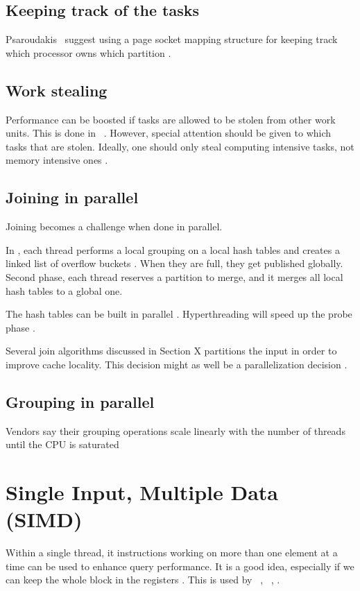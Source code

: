 \subsection{Keeping track of the tasks}
\label{sub:Keeping track of the tasks}
Psaroudakis \ea~suggest using a page socket mapping structure for keeping track which processor owns which partition \cite{Psaroudakis2015-lc}.


\subsection{Work stealing}
\label{sub:Work stealing}
Performance can be boosted if tasks are allowed to be stolen from other work units. This is done in \blink~\cite{Barber2012-xt}. However, special attention should be given to which tasks that are stolen. Ideally, one should only steal computing intensive tasks, not memory intensive ones \cite{Psaroudakis2015-lc}.

\subsection{Joining in parallel}
\label{sub:Joining in parallel}
Joining becomes a challenge when done in parallel.

In \ibm, each thread performs a local grouping on a local hash tables and creates a linked list of overflow buckets \cite{Raman2013-em}. When they are full, they get published globally. Second phase, each thread reserves a partition to merge, and it merges all local hash tables to a global one.

The hash tables can be built in parallel \cite{Barber2014-ey}. Hyperthreading will speed up the probe phase .

Several join algorithms discussed in Section X partitions the input in order to improve cache locality. This decision might as well be a parallelization decision \cite{Neumann1011-uq}.

\subsection{Grouping in parallel}
\label{sub:Grouping in parallel}
Vendors say their grouping operations scale linearly with the number of threads until the CPU is saturated \cite{Farber2012-vh}

\section{Single Input, Multiple Data (SIMD)}
\label{sec:Single Input, Multiple Instructions (SIMD)}
Within a single thread, it instructions working on more than one element at a time can be used to enhance query performance. It is a good idea, especially if we can keep the whole block in the registers \cite{Neumann2011-uq}. This is used by \oracle~\cite{Lahiri2015-mz}, \blink~\cite{Barber2012-xt}, \ibm.

